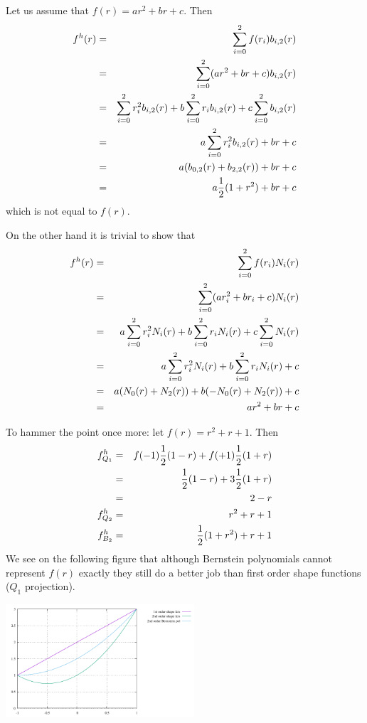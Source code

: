 Let us assume that $f(r)=ar^2+br+c$. Then 
\begin{eqnarray}
f^h(r) 
&=& \sum_{i=0}^2 f(r_i) b_{i,2}(r) \nonumber \\
&=& \sum_{i=0}^2 (ar^2+br+c) b_{i,2}(r) \nonumber\\
&=& \sum_{i=0}^2 r_i^2 b_{i,2}(r) + b \sum_{i=0}^2 r_i b_{i,2}(r) + c \sum_{i=0}^2 b_{i,2}(r) \nonumber\\
&=& a\sum_{i=0}^2 r_i^2 b_{i,2}(r) + br + c \nonumber\\
&=& a (b_{0,2}(r) + b_{2,2}(r)) + br + c \nonumber\\
&=& a\frac{1}{2}(1+r^2)  + br + c 
\end{eqnarray}
which is not equal to $f(r)$.

On the other hand it is trivial to show that 
\begin{eqnarray}
f^h(r) 
&=&  \sum_{i=0}^2 f(r_i) N_i(r) \nonumber \\
&=&  \sum_{i=0}^2   (ar_i^2+br_i+c)  N_i(r) \nonumber \\
&=&  a \sum_{i=0}^2  r_i^2 N_i(r) + b \sum_{i=0}^2 r_i  N_i(r) +  c \sum_{i=0}^2  N_i(r) \nonumber \\
&=&  a \sum_{i=0}^2  r_i^2 N_i(r) + b \sum_{i=0}^2 r_i  N_i(r) +  c \nonumber\\
&=&  a (N_0(r)+N_2(r)) + b (-N_0(r) +N_2(r)) +  c \nonumber\\
&=&  a r^2  + b r+ c 
\end{eqnarray}

To hammer the point once more: let $f(r)=r^2+r+1$.
Then 
\begin{eqnarray}
f^h_{Q_1} 
&=& f(-1) \frac{1}{2}(1-r) + f(+1) \frac{1}{2}(1+r) \nonumber\\
&=&  \frac{1}{2}(1-r) + 3 \frac{1}{2}(1+r) \nonumber\\
&=& 2-r \\
f^h_{Q_2} &=& r^2+r+1 \\
f^h_{B_2} &=& \frac{1}{2} (1+r^2)+r+1 
\end{eqnarray}
We see on the following figure that although Bernstein polynomials cannot 
represent $f(r)$ exactly they still do a better job than first order shape functions
($Q_1$ projection).
\begin{center}
\includegraphics[width=7cm]{images/bernstein/hammer.pdf}
\end{center}

